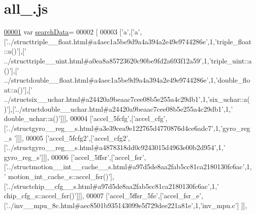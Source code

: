 \hypertarget{all__1_8js_source}{}\section{all\+\_.\+js}
\label{all__1_8js_source}

\begin{DoxyCode}
\hypertarget{all__1_8js_source.tex_l00001}{}\hyperlink{all__1_8js_ad01a7523f103d6242ef9b0451861231e}{00001} var \hyperlink{all__1_8js_ad01a7523f103d6242ef9b0451861231e}{searchData}=
00002 [
00003   [\textcolor{charliteral}{'a'},[\textcolor{charliteral}{'a'},[\textcolor{stringliteral}{'../structtriple\_\_float.html#a4aec1a5be9d9a4a394a2e49e9744286e'},1,\textcolor{stringliteral}{'triple\_float::a()'}],[\textcolor{stringliteral}{'
      ../structtriple\_\_uint.html#a0ea8a85723620c90be9fd2a693f12a59'},1,\textcolor{stringliteral}{'triple\_uint::a()'}],[\textcolor{stringliteral}{'
      ../structdouble\_\_float.html#a4aec1a5be9d9a4a394a2e49e9744286e'},1,\textcolor{stringliteral}{'double\_float::a()'}],[\textcolor{stringliteral}{'
      ../structsix\_\_uchar.html#a24420a9beaac7cee08b5e255a4c29db1'},1,\textcolor{stringliteral}{'six\_uchar::a()'}],[\textcolor{stringliteral}{'../structdouble\_\_uchar.html#a24420a9beaac7cee08b5e255a4c29db1'},1,\textcolor{stringliteral}{'
      double\_uchar::a()'}]]],
00004   [\textcolor{stringliteral}{'accel\_5fcfg'},[\textcolor{stringliteral}{'accel\_cfg'},[\textcolor{stringliteral}{'../structgyro\_\_reg\_\_s.html#a3e39cea9e122765d4770876d4ce6adc7'},1,\textcolor{stringliteral}{'gyro\_reg\_s
      '}]]],
00005   [\textcolor{stringliteral}{'accel\_5fcfg2'},[\textcolor{stringliteral}{'accel\_cfg2'},[\textcolor{stringliteral}{'../structgyro\_\_reg\_\_s.html#a4878318dd0c9243015d4963e00b2d954'},1,\textcolor{stringliteral}{'
      gyro\_reg\_s'}]]],
00006   [\textcolor{stringliteral}{'accel\_5ffsr'},[\textcolor{stringliteral}{'accel\_fsr'},[\textcolor{stringliteral}{'../structmotion\_\_int\_\_cache\_\_s.html#a97d5de8aa2fab5cc81ca2180130fc6ac'},1,\textcolor{stringliteral}{'
      motion\_int\_cache\_s::accel\_fsr()'}],[\textcolor{stringliteral}{'../structchip\_\_cfg\_\_s.html#a97d5de8aa2fab5cc81ca2180130fc6ac'},1,\textcolor{stringliteral}{'
      chip\_cfg\_s::accel\_fsr()'}]]],
00007   [\textcolor{stringliteral}{'accel\_5ffsr\_5fe'},[\textcolor{stringliteral}{'accel\_fsr\_e'},[\textcolor{stringliteral}{'../inv\_\_mpu\_8c.html#aec8501b935143099e5f729dee221a81e'},1,\textcolor{stringliteral}{'inv\_mpu.c'}]
      ]],

\end{DoxyCode}
